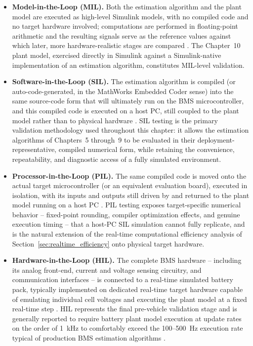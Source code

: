\begin{itemize}
	\item \textbf{Model-in-the-Loop (MIL).} Both the estimation algorithm and the plant model are executed as high-level Simulink models, with no compiled code and no target hardware involved; computations are performed in floating-point arithmetic and the resulting signals serve as the reference values against which later, more hardware-realistic stages are compared \cite{empirical_mil_sil_arxiv}. The Chapter~10 plant model, exercised directly in Simulink against a Simulink-native implementation of an estimation algorithm, constitutes MIL-level validation.
	\item \textbf{Software-in-the-Loop (SIL).} The estimation algorithm is compiled (or auto-code-generated, in the MathWorks Embedded Coder sense) into the same source-code form that will ultimately run on the BMS microcontroller, and this compiled code is executed on a host PC, still coupled to the plant model rather than to physical hardware \cite{mathworks_bms_solutions}. SIL testing is the primary validation methodology used throughout this chapter: it allows the estimation algorithms of Chapters~5 through~9 to be evaluated in their deployment-representative, compiled numerical form, while retaining the convenience, repeatability, and diagnostic access of a fully simulated environment.
	\item \textbf{Processor-in-the-Loop (PIL).} The same compiled code is moved onto the actual target microcontroller (or an equivalent evaluation board), executed in isolation, with its inputs and outputs still driven by and returned to the plant model running on a host PC \cite{embitel_mil_sil_hil}. PIL testing exposes target-specific numerical behavior -- fixed-point rounding, compiler optimization effects, and genuine execution timing -- that a host-PC SIL simulation cannot fully replicate, and is the natural extension of the real-time computational efficiency analysis of Section~\ref{sec:realtime_efficiency} onto physical target hardware.
	\item \textbf{Hardware-in-the-Loop (HIL).} The complete BMS hardware -- including its analog front-end, current and voltage sensing circuitry, and communication interfaces -- is connected to a real-time simulated battery pack, typically implemented on dedicated real-time target hardware capable of emulating individual cell voltages and executing the plant model at a fixed real-time step \cite{mathworks_hil_bms_webinar}. HIL represents the final pre-vehicle validation stage and is generally reported to require battery plant model execution at update rates on the order of 1~kHz to comfortably exceed the 100--500~Hz execution rate typical of production BMS estimation algorithms \cite{mathworks_hil_bms_video}.
\end{itemize}

